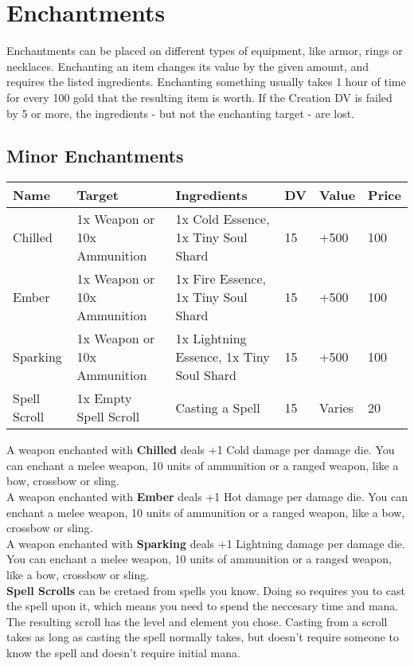 \section{Enchantments}

Enchantments can be placed on different types of equipment, like armor, rings or necklaces. Enchanting an item changes its value by the given amount, and requires the listed ingredients. Enchanting something usually takes 1 hour of time for every 100 gold that the resulting item is worth. If the Creation DV is failed by 5 or more, the ingredients - but not the enchanting target - are lost.\\


\subsection{Minor Enchantments}
\begin{longtable}{l | p{2.5cm} | p{2.5cm}| l |l | l }
	Name & Target & Ingredients & DV & Value & Price\\ \hline
	Chilled & 1x Weapon or 10x Ammunition & 1x Cold Essence, 1x Tiny Soul Shard & 15 & +500 & 100\\
	Ember & 1x Weapon or 10x Ammunition & 1x Fire Essence, 1x Tiny Soul Shard & 15 & +500 & 100\\
	Sparking & 1x Weapon or 10x Ammunition & 1x Lightning Essence, 1x Tiny Soul Shard & 15 & +500 & 100\\
	Spell Scroll & 1x Empty Spell Scroll & Casting a Spell & 15 & Varies & 20\\
\end{longtable}

A weapon enchanted with \textbf{Chilled} deals +1 Cold damage per damage die. You can enchant a melee weapon, 10 units of ammunition or a ranged weapon, like a bow, crossbow or sling.\\


A weapon enchanted with \textbf{Ember} deals +1 Hot damage per damage die. You can enchant a melee weapon, 10 units of ammunition or a ranged weapon, like a bow, crossbow or sling.\\


A weapon enchanted with \textbf{Sparking} deals +1 Lightning damage per damage die. You can enchant a melee weapon, 10 units of ammunition or a ranged weapon, like a bow, crossbow or sling.\\


\textbf{Spell Scrolls} can be cretaed from spells you know. Doing so requires you to cast the spell upon it, which means you need to spend the neccesary time and mana. The resulting scroll has the level and element you chose. Casting from a scroll takes as long as casting the spell normally takes, but doesn't require someone to know the spell and doesn't require initial mana.